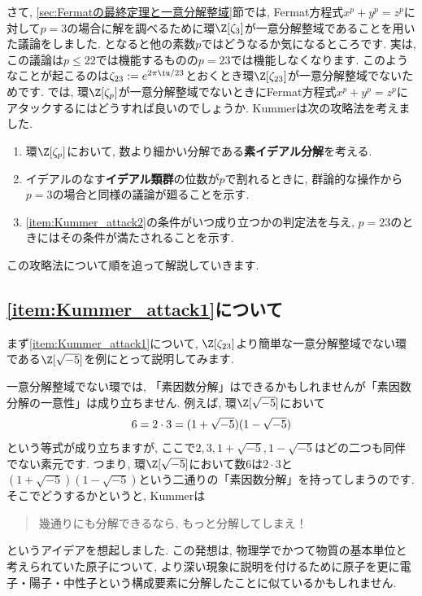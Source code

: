 \documentclass[11pt,b5paper,oneside,titlepage,lualatex]{ltjsreport}
\begin{document}
さて, \ref{sec:Fermatの最終定理と一意分解整域}節では, Fermat方程式$ x^p + y^p = z^p $に対して$ p=3 $の場合に解を調べるために環$ \Z[\zeta_3] $が一意分解整域であることを用いた議論をしました. 
となると他の素数$ p $ではどうなるか気になるところです. 
実は, この議論は$ p \le 22 $では機能するものの$ p = 23 $では機能しなくなります. 
このようなことが起こるのは$ \zeta_{23} := e^{2\pi\iu/23} $とおくとき環$ \Z[\zeta_{23}] $が一意分解整域でないためです. 
では, 環$ \Z[\zeta_p] $が一意分解整域でないときにFermat方程式$ x^p + y^p = z^p $にアタックするにはどうすれば良いのでしょうか. 
Kummerは次の攻略法を考えました. 
\begin{enumerate}
	\item \label{item:Kummer_attack1} 環$ \Z[\zeta_p] $において, 数より細かい分解である\textbf{素イデアル分解}を考える. 
	\item \label{item:Kummer_attack2} イデアルのなす\textbf{イデアル類群}の位数が$ p $で割れるときに, 群論的な操作から$ p=3 $の場合と同様の議論が廻ることを示す. 
	\item \label{item:Kummer_attack3} \ref{item:Kummer_attack2}の条件がいつ成り立つかの判定法を与え, $ p=23 $のときにはその条件が満たされることを示す. 
\end{enumerate}
この攻略法について順を追って解説していきます. 


\subsection{\ref{item:Kummer_attack1}について}


まず\ref{item:Kummer_attack1}について, $ \Z[\zeta_{23}] $より簡単な一意分解整域でない環である$ \Z[\sqrt{-5}] $を例にとって説明してみます. 

一意分解整域でない環では, 「素因数分解」はできるかもしれませんが「素因数分解の一意性」は成り立ちません. 
例えば, 環$ \Z[\sqrt{-5}] $において
\begin{equation} \label{decomp_sqrt{-5}}
	6 = 2 \cdot 3 = (1 + \sqrt{-5}) (1 - \sqrt{-5})
\end{equation}
という等式が成り立ちますが, ここで$ 2, 3, 1 + \sqrt{-5}, 1 - \sqrt{-5} $はどの二つも同伴でない素元です. 
つまり, 環$ \Z[\sqrt{-5}] $において数$ 6 $は$ 2 \cdot 3 $と$ (1 + \sqrt{-5}) (1 - \sqrt{-5}) $という二通りの「素因数分解」を持ってしまうのです. 
そこでどうするかというと, Kummerは
\begin{quote}
	\centering
	幾通りにも分解できるなら, もっと分解してしまえ！
\end{quote}
というアイデアを想起しました. 
この発想は, 物理学でかつて物質の基本単位と考えられていた原子について, より深い現象に説明を付けるために原子を更に電子・陽子・中性子という構成要素に分解したことに似ているかもしれません. 
\end{document}
